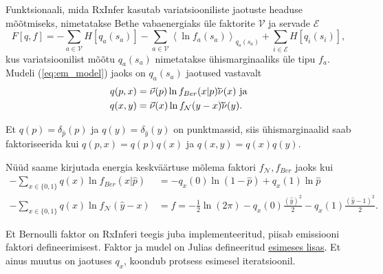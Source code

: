 Funktsionaali, mida RxInfer kasutab variatsiooniliste jaotuste headuse mõõtmiseks, nimetatakse Bethe vabaenergiaks üle faktorite $\mathcal{V}$ ja servade $\mathcal{E}$
\begin{equation}
    \label{eq:bethe}
    F[q,f] = - \sum_{a \in \mathcal{V}} {H[q_a(s_a)]} - \sum_{a \in \mathcal{V}}{\left< \ln f_a(s_a) \right>_{q_{a}(s_a)}} + \sum_{i \in \mathcal{E}}{H[q_i(s_i)]},
\end{equation}
kus variatsioonilist mõõtu $q_a(s_a)$ nimetatakse ühismarginaaliks üle tipu $f_a$. Mudeli (\ref{eq:em_model}) jaoks on $q_a(s_a)$ jaotused vastavalt
\begin{align*}
    q(p, x) &= \vec{\nu}(p) \ln f_{Ber}(x | p) \cev{\nu}(x) \text{ ja}\\
    q(x, y) &= \vec{\nu}(x) \ln f_{\mathcal{N}}(y - x)\cev{\nu}(y).
\end{align*}

Et $q(p) = \delta_{\hat{p}}(p)$ ja $q(y) = \delta_{\hat{y}}(y)$ on punktmassid, siis ühismarginaalid saab faktoriseerida kui $q(p, x) = q(p)q(x)$ ja $q(x, y) = q(x)q(y)$.

Nüüd saame kirjutada energia keskväärtuse mõlema faktori $f_{\mathcal{N}}, f_{Ber}$ jaoks kui
\begin{align*}
    -\sum_{x \in \{0,1\}} q(x)\ln f_{Ber}(x | \hat{p}) &= -q_x(0)\ln (1-\hat{p}) + q_x(1) \ln \hat{p}\\
    -\sum_{x \in \{0,1\}} q(x) \ln f_{\mathcal{N}}(\hat{y} - x) &=f =  -\frac{1}{2}\ln(2\pi) - q_x(0) \frac{(\hat{y})^2}{2} - q_x(1)\frac{(\hat{y}-1)^2}{2}.
\end{align*}

Et Bernoulli faktor on RxInferi teegis juba implementeeritud, piisab emissiooni faktori defineerimisest. Faktor ja mudel on Julias defineeritud
\hyperref[section:lisa1]{esimeses lisas}. Et ainus muutus on jaotuses $q_x$, koondub protsess esimesel iteratsioonil.


